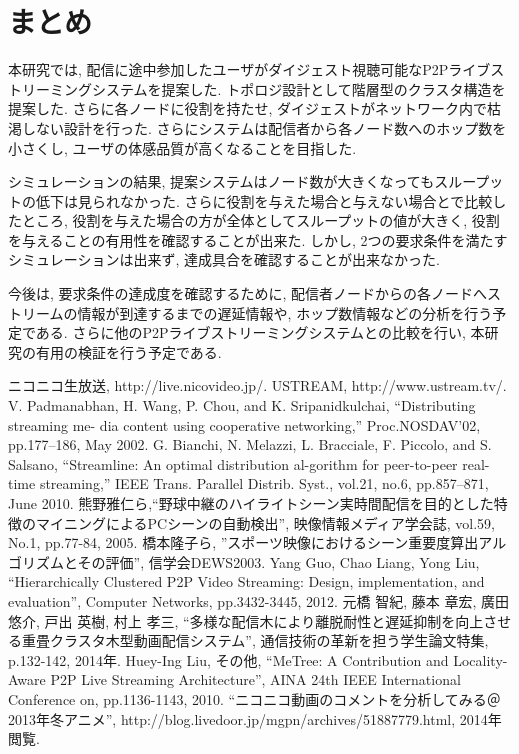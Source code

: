\documentclass[letter]{ieicej}
\begin{document}
\section{まとめ}
本研究では, 配信に途中参加したユーザがダイジェスト視聴可能なP2Pライブストリーミングシステムを提案した. トポロジ設計として階層型のクラスタ構造を提案した. さらに各ノードに役割を持たせ, ダイジェストがネットワーク内で枯渇しない設計を行った. さらにシステムは配信者から各ノード数へのホップ数を小さくし, ユーザの体感品質が高くなることを目指した.

シミュレーションの結果, 提案システムはノード数が大きくなってもスループットの低下は見られなかった. さらに役割を与えた場合と与えない場合とで比較したところ, 役割を与えた場合の方が全体としてスループットの値が大きく, 役割を与えることの有用性を確認することが出来た. しかし, 2つの要求条件を満たすシミュレーションは出来ず, 達成具合を確認することが出来なかった.

今後は, 要求条件の達成度を確認するために, 配信者ノードからの各ノードへストリームの情報が到達するまでの遅延情報や, ホップ数情報などの分析を行う予定である. さらに他のP2Pライブストリーミングシステムとの比較を行い, 本研究の有用の検証を行う予定である.

\begin{thebibliography}{99}

ニコニコ生放送, http://live.nicovideo.jp/.
USTREAM, http://www.ustream.tv/.
V. Padmanabhan, H. Wang, P. Chou, and K. Sripanidkulchai, “Distributing streaming me-
dia content using cooperative networking,” Proc.NOSDAV’02, pp.177–186, May 2002.
G. Bianchi, N. Melazzi, L. Bracciale, F. Piccolo, and S. Salsano, “Streamline: An optimal distribution al-gorithm for peer-to-peer real-time streaming,” IEEE Trans. Parallel Distrib. Syst., vol.21, no.6, pp.857–871, June 2010.
熊野雅仁ら,“野球中継のハイライトシーン実時間配信を目的とした特徴のマイニングによるPCシーンの自動検出”, 映像情報メディア学会誌, vol.59, No.1, pp.77-84, 2005.
橋本隆子ら, ”スポーツ映像におけるシーン重要度算出アルゴリズムとその評価”, 信学会DEWS2003.
 Yang Guo, Chao Liang, Yong Liu, “Hierarchically Clustered P2P Video Streaming: Design, implementation, and evaluation”, Computer Networks, pp.3432-3445, 2012.
 元橋 智紀, 藤本 章宏, 廣田 悠介, 戸出 英樹, 村上 孝三, “多様な配信木により離脱耐性と遅延抑制を向上させる重畳クラスタ木型動画配信システム”, 通信技術の革新を担う学生論文特集, p.132-142, 2014年.
 Huey-Ing Liu, その他, “MeTree: A Contribution and Locality-Aware P2P Live Streaming Architecture”, AINA 24th IEEE International Conference on, pp.1136-1143, 2010.
 “ニコニコ動画のコメントを分析してみる＠2013年冬アニメ”, http://blog.livedoor.jp/mgpn/archives/51887779.html, 2014年閲覧.


\end{thebibliography}
\end{document}
